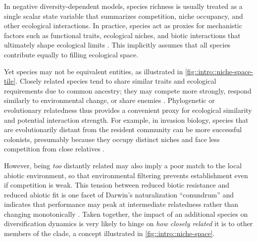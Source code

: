 

In negative diversity-dependent models, species richness is usually treated as a single scalar state variable that summarizes competition, niche occupancy, and other ecological interactions. In practice, species act as proxies for mechanistic factors such as functional traits, ecological niches, and biotic interactions that ultimately shape ecological limits \citep{srivastava_phylogenetic_2012,kondratyeva_reconciling_2019}. This implicitly assumes that all species contribute equally to filling ecological space.



Yet species may not be equivalent entities, as illustrated in \autoref{fig::intro::niche-space-tile}. Closely related species tend to share similar traits and ecological requirements due to common ancestry; they may compete more strongly, respond similarly to environmental change, or share enemies \citep{srivastava_phylogenetic_2012,helmus_phylogenetic_2007,cadotte_phylogenetic_2012,pigot_quantifying_2016}. Phylogenetic or evolutionary relatedness thus provides a convenient proxy for ecological similarity and potential interaction strength. For example, in invasion biology, species that are evolutionarily distant from the resident community can be more successful colonists, presumably because they occupy distinct niches and face less competition from close relatives \citep{zheng_species_2018,henn_environmental_2019,qin_phylogenetic_2020}. 

However, being \emph{too} distantly related may also imply a poor match to the local abiotic environment, so that environmental filtering prevents establishment even if competition is weak. This tension between reduced biotic resistance and reduced abiotic fit is one facet of Darwin's naturalization “conundrum” and indicates that performance may peak at intermediate relatedness rather than changing monotonically \citep{gallien_contrasting_2015, ma_different_2016, park_darwins_2020}. Taken together, the impact of an additional species on diversification dynamics is very likely to hinge on \emph{how closely related} it is to other members of the clade, a concept illustrated in \autoref{fig::intro::niche-space}.

